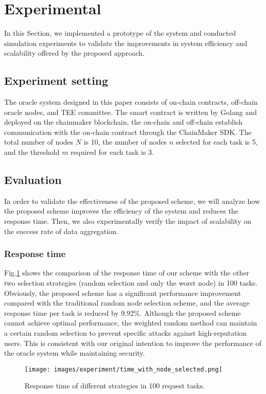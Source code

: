 \documentclass[paper]{ieice}
\begin{document}
\section{Experimental}
\label{result}

In this Section, we implemented a prototype of the system and conducted simulation experiments to validate the improvements in system efficiency and scalability offered by the proposed approach.

\subsection{Experiment setting}
The oracle system designed in this paper consists of on-chain contracts, off-chain oracle nodes, and TEE committee. The smart contract is written by Golang and deployed on the chainmaker blockchain\cite{chainmaker}, the on-chain and off-chain establish communication with the on-chain contract through the ChainMaker SDK. The total number of nodes $N$ is 10, the number of nodes $n$ selected for each task is 5, and the threshold $m$ required for each task is 3.

\subsection{Evaluation}
In order to validate the effectiveness of the proposed scheme, we will analyze how the proposed scheme improves the efficiency of the system and reduces the response time. Then, we also experimentally verify the impact of scalability on the success rate of data aggregation.

 \subsubsection{Response time}
Fig.\ref{fig:time} shows the comparison of the response time of our scheme with the other two selection strategies (random selection and only the worst node) in 100 tasks. Obviously, the proposed scheme has a significant performance improvement compared with the traditional random node selection scheme, and the average response time per task is reduced by 9.92\%. Although the proposed scheme cannot achieve optimal performance, the weighted random method can maintain a certain random selection to prevent specific attacks against high-reputation users. This is consistent with our original intention to improve the performance of the oracle system while maintaining security.

\begin{figure}[h!]
    \centering
    \texttt{[image: images/experiment/time\_with\_node\_selected.png]}
    \caption{Response time of different strategies in 100 request tasks.}
    \label{fig:time}
\end{figure}
\end{document}
